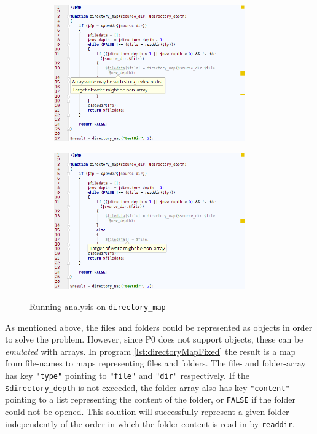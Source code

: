 \begin{figure}
\centering
\begin{subfigure}{\textwidth}
\centering
\includegraphics[width=0.9\textwidth]{chapters/caseStudy/screens/dir1}
\label{fig:directoryScreenshot1}

\end{subfigure}
\begin{subfigure}{\textwidth}
\centering
\includegraphics[width=0.9\textwidth]{chapters/caseStudy/screens/dir2}
\label{fig:directoryScreenshot2}

\end{subfigure}
\caption{Running analysis on \texttt{directory\_map}}
\label{fig:directoryScreenshot}
\end{figure}

As mentioned above, the files and folders could be represented as objects in order to solve the problem. However, since P0 does not support objects, these can be \textit{emulated} with arrays. In program \ref{lst:directoryMapFixed} the result is a map from file-names to maps representing files and folders. The file- and folder-array has key \texttt{"type"} pointing to \texttt{"file"} and \texttt{"dir"} respectively. If the \texttt{\$directory\_depth} is not exceeded, the folder-array also has key \texttt{"content"} pointing to a list representing the content of the folder, or \texttt{FALSE} if the folder could not be opened.  This solution will successfully represent a given folder independently of the order in which the folder content is read in by \texttt{readdir}.


